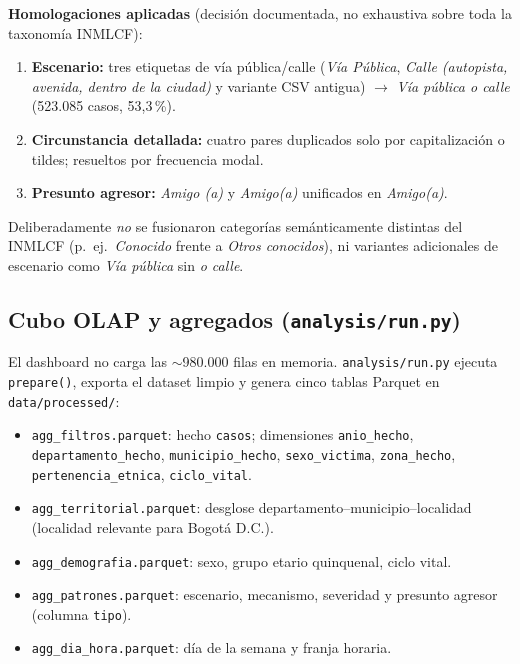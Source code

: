 \documentclass[
	a4paper,
	10pt,
	unnumberedsections,
	twoside,
]{LTJournalArticle}
\begin{document}
\textbf{Homologaciones aplicadas} (decisi\'on documentada, no exhaustiva sobre toda la taxonom\'ia INMLCF):
\begin{enumerate}
	\item \textbf{Escenario:} tres etiquetas de v\'ia p\'ublica/calle (\emph{V\'ia P\'ublica}, \emph{Calle (autopista, avenida, dentro de la ciudad)} y variante CSV antigua) $\rightarrow$ \emph{V\'ia p\'ublica o calle} (523.085 casos, 53{,}3\,\%).
	\item \textbf{Circunstancia detallada:} cuatro pares duplicados solo por capitalizaci\'on o tildes; resueltos por frecuencia modal.
	\item \textbf{Presunto agresor:} \emph{Amigo (a)} y \emph{Amigo(a)} unificados en \emph{Amigo(a)}.
\end{enumerate}
Deliberadamente \emph{no} se fusionaron categor\'ias sem\'anticamente distintas del INMLCF (p.\ ej.\ \emph{Conocido} frente a \emph{Otros conocidos}), ni variantes adicionales de escenario como \emph{V\'ia p\'ublica} sin \emph{o calle}.

\subsection{Cubo OLAP y agregados (\texttt{analysis/run.py})}

El dashboard no carga las $\sim$980.000 filas en memoria.
\texttt{analysis/run.py} ejecuta \texttt{prepare()}, exporta el dataset limpio y genera cinco tablas Parquet en \texttt{data/processed/}:

\begin{itemize}
	\item \texttt{agg\_filtros.parquet}: hecho \texttt{casos}; dimensiones \texttt{anio\_hecho}, \texttt{departamento\_hecho}, \texttt{municipio\_hecho}, \texttt{sexo\_victima}, \texttt{zona\_hecho}, \texttt{pertenencia\_etnica}, \texttt{ciclo\_vital}.
	\item \texttt{agg\_territorial.parquet}: desglose departamento--municipio--localidad (localidad relevante para Bogot\'a D.C.).
	\item \texttt{agg\_demografia.parquet}: sexo, grupo etario quinquenal, ciclo vital.
	\item \texttt{agg\_patrones.parquet}: escenario, mecanismo, severidad y presunto agresor (columna \texttt{tipo}).
	\item \texttt{agg\_dia\_hora.parquet}: d\'ia de la semana y franja horaria.
\end{itemize}
\end{document}
